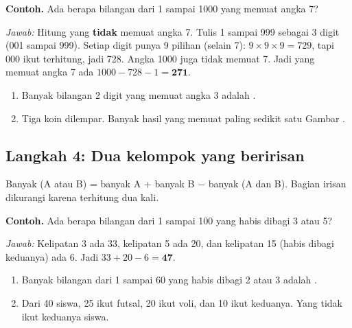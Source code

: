 \documentclass[11pt,a4paper]{article}
\begin{document}
\begin{contoh}
\textbf{Contoh.} Ada berapa bilangan dari 1 sampai 1000 yang memuat angka 7?

\textit{Jawab:} Hitung yang \textbf{tidak} memuat angka 7. Tulis 1 sampai 999 sebagai 3 digit
(001 sampai 999). Setiap digit punya 9 pilihan (selain 7): $9 \times 9 \times 9 = 729$, tapi
000 ikut terhitung, jadi 728. Angka 1000 juga tidak memuat 7.
Jadi yang memuat angka 7 ada $1000 - 728 - 1 = \textbf{271}$.
\end{contoh}

\begin{giliranmu}
\begin{enumerate}[label=\alph*.]
    \item Banyak bilangan 2 digit yang memuat angka 3 adalah \kosong.
    \item Tiga koin dilempar. Banyak hasil yang memuat paling sedikit satu Gambar \kosong.
\end{enumerate}
\end{giliranmu}

\subsection*{Langkah 4: Dua kelompok yang beririsan}
Banyak (A atau B) = banyak A + banyak B $-$ banyak (A dan B).
Bagian irisan dikurangi karena terhitung dua kali.

\begin{contoh}
\textbf{Contoh.} Ada berapa bilangan dari 1 sampai 100 yang habis dibagi 3 atau 5?

\textit{Jawab:} Kelipatan 3 ada 33, kelipatan 5 ada 20, dan kelipatan 15 (habis dibagi keduanya)
ada 6. Jadi $33 + 20 - 6 = \textbf{47}$.

\begin{center}
\end{center}
\end{contoh}

\begin{giliranmu}
\begin{enumerate}[label=\alph*.]
    \item Banyak bilangan dari 1 sampai 60 yang habis dibagi 2 atau 3 adalah \kosong.
    \item Dari 40 siswa, 25 ikut futsal, 20 ikut voli, dan 10 ikut keduanya. Yang tidak ikut
          keduanya \kosong{} siswa.
\end{enumerate}
\end{giliranmu}
\end{document}
